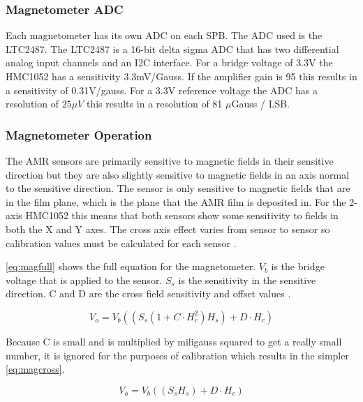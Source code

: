 \subsubsection{Magnetometer \acl{ADC}}

Each magnetometer has its own \ac{ADC} on each \ac{SPB}. The \ac{ADC} used is the LTC2487. The LTC2487 is a 16-bit delta sigma \ac{ADC} that has two differential analog input channels and an \ac{I2C} interface. For a bridge voltage of 3.3V the HMC1052 has a sensitivity 3.3mV/Gauss. If the amplifier gain is 95 this results in a sensitivity of 0.31V/gauss. For a 3.3V reference voltage the \ac{ADC} has a resolution of $25 \mu V$ this results in a resolution of 81 $\mu$Gauss / LSB.

\subsubsection{Magnetometer Operation}


The \ac{AMR} sensors are primarily sensitive to magnetic fields in their sensitive direction but they are also slightly sensitive to magnetic fields in an axis normal to the sensitive direction. The sensor is only sensitive to magnetic fields that are in the film plane, which is the plane that the \ac{AMR} film is deposited in. For the 2-axis HMC1052 this means that both sensors show some sensitivity to fields in both the X and Y axes. The cross axis effect varies from sensor to sensor  so calibration values must be calculated for each sensor \cite{AN215}.

\autoref{eq:magfull} shows the full equation for the magnetometer. $V_b$ is the bridge voltage that is applied to the sensor. $S_s$ is the sensitivity in the sensitive direction. C and D are the cross field sensitivity and offset values \cite{AN215}.

\begin{equation}
    V_o = V_b \left( \left( S_s \left( 1 + C \cdot H_c^2 \right) H_s \right) + D \cdot H_c \right)
    \label{eq:magfull}
\end{equation}

Because C is small and is multiplied by miligauss squared to get a really small number, it is ignored for the purposes of calibration which results in the simpler \autoref{eq:magcross}.

\begin{equation}
    V_o = V_b \left( \left( S_s H_s \right) + D \cdot H_c \right)
    \label{eq:magcross}
\end{equation}


